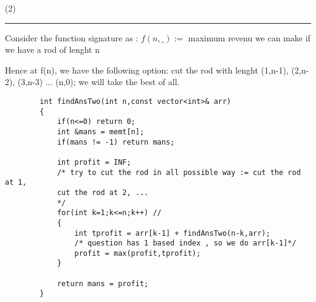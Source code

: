 \begin{solution}
    (2)
    \vspace{3mm}
    \hrule
    
   
        Consider the function signature as :
        $f(n,\_) :=$ maximum revenu we can make if we have a rod of lenght n

    Hence at f(n), we have the following option: 
    cut the rod with lenght (1,n-1), (2,n-2), (3,n-3) ... (n,0); we will take the best of all.

    \begin{verbatim}
        int findAnsTwo(int n,const vector<int>& arr)
        {
            if(n<=0) return 0;
            int &mans = memt[n];
            if(mans != -1) return mans;

            int profit = INF;
            /* try to cut the rod in all possible way := cut the rod at 1,
            cut the rod at 2, ...
            */
            for(int k=1;k<=n;k++) //
            {
                int tprofit = arr[k-1] + findAnsTwo(n-k,arr); 
                /* question has 1 based index , so we do arr[k-1]*/
                profit = max(profit,tprofit);
            }

            return mans = profit;
        }
    \end{verbatim}
    
\end{solution}

